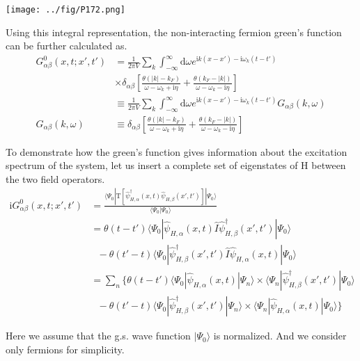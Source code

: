 \begin{center}
\texttt{[image: ../fig/P172.png]}
\end{center}
Using this integral representation, the non-interacting fermion green's function can be further calculated as.  
\begin{align}\label{2.3.6}
G^0_{\alpha\beta}(x,t;x',t')&=\frac{1}{2\pi V}\sum_k \int_{-\infty}^{\infty} \mathrm{d}\omega e^{\mathrm{i}k(x-x')-\mathrm{i}\omega_{k}(t-t')} \nonumber \\
& \times \delta_{\alpha\beta}[\frac{\theta(|k|-k_F)}{\omega-\omega_k+\mathrm{i}\eta}+\frac{\theta(k_F-|k|)}{\omega-\omega_k-\mathrm{i}\eta}] \nonumber \\
&\equiv \frac{1}{2\pi V}\sum_k \int_{-\infty}^{\infty}\mathrm{d}\omega e^{\mathrm{i}k(x-x')-\mathrm{i}\omega_{k}(t-t')} G_{\alpha\beta}(k,\omega) \nonumber \\
G_{\alpha\beta}(k,\omega)&\equiv \delta_{\alpha\beta}[\frac{\theta(|k|-k_F)}{\omega-\omega_k+\mathrm{i}\eta}+\frac{\theta(k_F-|k|)}{\omega-\omega_k-\mathrm{i}\eta}] 
\end{align}

To demonstrate how the green's function gives information about the excitation spectrum of the system, let us insert a complete set of eigenstates of H between the two field operators.
\begin{align}\label{2.3.7}
\mathrm{i}G^0_{\alpha\beta}(x,t;x',t')&=\frac{\langle\Psi_0|\mathrm{T}[\hat \psi^{
\dagger}_{H,\alpha}(x,t)\hat \psi_{H,\beta} (x',t')]|\Psi_0\rangle}{\langle\Psi_0|\Psi_0\rangle} \nonumber \\
&=\theta(t-t')\langle\Psi_0|\hat \psi_{H,\alpha}(x,t)\hat{I}\hat \psi^{
\dagger}_{H,\beta} (x',t')|\Psi_0\rangle \nonumber \\
& \ \ \ -\theta(t'-t)\langle\Psi_0|\hat \psi^{
\dagger}_{H,\beta}(x',t')\hat{I}\hat \psi_{H,\alpha} (x,t)|\Psi_0\rangle \nonumber \\
&=\sum_n\{\theta(t-t')\langle\Psi_0|\hat \psi_{H,\alpha}(x,t)|\Psi_n\rangle\times\langle\Psi_n|\hat \psi^{
\dagger}_{H,\beta} (x',t')|\Psi_0\rangle \nonumber \\
& \ \ \ -\theta(t'-t)\langle\Psi_0|\hat \psi^{
\dagger}_{H,\beta}(x',t')|\Psi_n\rangle\times\langle\Psi_n|\hat \psi_{H,\alpha} (x,t)|\Psi_0\rangle\}
\end{align}

Here we assume that the g.s. wave function $|\Psi_0\rangle$ is normalized. And we consider only fermions for simplicity.

